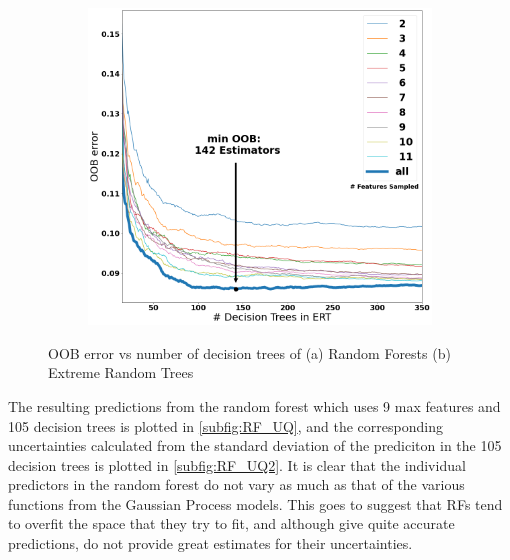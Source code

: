 \documentclass[a4paper, twoside, final, 12pt]{article}
\begin{document}
{\begin{figure}
\begin{subfigure}{0.48\linewidth}
	\end{subfigure}
	\begin{subfigure}{0.5\linewidth}
		\centering
		\includegraphics[scale=0.2]{./src/ERT_oob_error}
		\caption{}
		\label{subfig:rf_rmse}
	\end{subfigure}
	\caption{OOB error vs number of decision trees of (a) Random Forests (b) Extreme Random Trees}
	\label{fig:RF_exp}
\end{figure}

The resulting predictions from the random forest which uses 9 max features and 105 decision trees is plotted in \ref{subfig:RF_UQ}, and the corresponding uncertainties calculated from the standard deviation of the prediciton in the 105 decision trees is plotted in \ref{subfig:RF_UQ2}.
It is clear that the individual predictors in the random forest do not vary as much as that of the various functions from the Gaussian Process models. 
This goes to suggest that RFs tend to overfit the space that they try to fit, and although give quite accurate predictions, do not provide great estimates for their uncertainties. 

}
\end{document}
